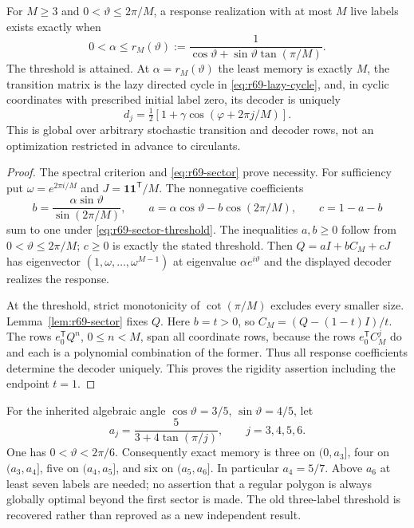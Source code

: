 \begin{theorem}\label{thm:r69-sector-phase}
For $M\ge3$ and $0<\vartheta\le2\pi/M$, a response realization with at most $M$ live labels exists exactly when
\begin{equation}\label{eq:r69-sector-threshold}
 0<\alpha\le r_M(\vartheta)
 :=\frac1{\cos\vartheta+\sin\vartheta\tan(\pi/M)}.
\end{equation}
The threshold is attained. At $\alpha=r_M(\vartheta)$ the least memory is exactly $M$, the transition matrix is the lazy directed cycle in \eqref{eq:r69-lazy-cycle}, and, in cyclic coordinates with prescribed initial label zero, its decoder is uniquely
\[
 d_j=\tfrac12[1+\gamma\cos(\varphi+2\pi j/M)].
\]
This is global over arbitrary stochastic transition and decoder rows, not an optimization restricted in advance to circulants.
\end{theorem}
\begin{proof}
The spectral criterion and \eqref{eq:r69-sector} prove necessity. For sufficiency put $\omega=e^{2\pi i/M}$ and $J=\mathbf1\mathbf1^{\mathsf T}/M$. The nonnegative coefficients
\[
 b=\frac{\alpha\sin\vartheta}{\sin(2\pi/M)},\qquad
 a=\alpha\cos\vartheta-b\cos(2\pi/M),\qquad
 c=1-a-b
\]
sum to one under \eqref{eq:r69-sector-threshold}. The inequalities $a,b\ge0$ follow from $0<\vartheta\le2\pi/M$; $c\ge0$ is exactly the stated threshold. Then $Q=aI+bC_M+cJ$ has eigenvector $(1,\omega,\ldots,\omega^{M-1})$ at eigenvalue $\alpha e^{i\vartheta}$ and the displayed decoder realizes the response.

At the threshold, strict monotonicity of $\cot(\pi/M)$ excludes every smaller size. Lemma~\ref{lem:r69-sector} fixes $Q$. Here $b=t>0$, so $C_M=(Q-(1-t)I)/t$. The rows $e_0^{\mathsf T}Q^n$, $0\le n<M$, span all coordinate rows, because the rows $e_0^{\mathsf T}C_M^j$ do and each is a polynomial combination of the former. Thus all response coefficients determine the decoder uniquely. This proves the rigidity assertion including the endpoint $t=1$.
\end{proof}

For the inherited algebraic angle $\cos\vartheta=3/5$, $\sin\vartheta=4/5$, let
\[
 a_j=\frac5{3+4\tan(\pi/j)},\qquad j=3,4,5,6.
\]
One has $0<\vartheta<2\pi/6$. Consequently exact memory is three on $(0,a_3]$, four on $(a_3,a_4]$, five on $(a_4,a_5]$, and six on $(a_5,a_6]$. In particular $a_4=5/7$. Above $a_6$ at least seven labels are needed; no assertion that a regular polygon is always globally optimal beyond the first sector is made. The old three-label threshold is recovered rather than reproved as a new independent result.

